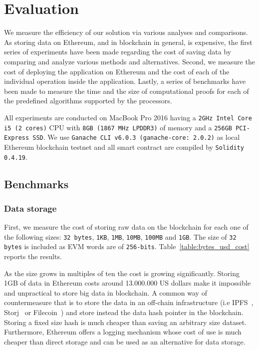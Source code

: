\chapter{Evaluation}
\label{evaluation}

We measure the efficiency of our solution via various analyses and comparisons. As storing data on Ethereum, and in blockchain in general, is expensive, the first series of experiments have been made regarding the cost of saving data by comparing and analyze various methods and alternatives. Second, we measure the cost of deploying the application on Ethereum and the cost of each of the individual operation inside the application. Lastly, a series of benchmarks have been made to measure the time and the size of computational proofs for each of the predefined algorithms supported by the processors.

All experiments are conducted on MacBook Pro 2016 having a \verb|2GHz Intel Core i5 (2 cores)| CPU with \verb|8GB (1867 MHz LPDDR3)| of memory and a \verb|256GB PCI-Express SSD|. We use \verb|Ganache CLI v6.0.3 (ganache-core: 2.0.2)| as local Ethereum blockchain testnet and all smart contract are compiled by \verb|Solidity 0.4.19|.

\section{Benchmarks}
\label{evaluation:benchmarks}

\subsection{Data storage}
\label{evaluation:data_storage}

First, we measure the cost of storing raw data on the blockchain for each one of the following sizes: \verb|32 bytes|, \verb|1KB|, \verb|1MB|, \verb|10MB|, \verb|100MB| and \verb|1GB|. The size of \verb|32 bytes| is included as EVM words are of \verb|256-bits|. Table~\ref{table:bytes_usd_cost} reports the results.

As the size grows in multiples of ten the cost is growing significantly. Storing 1GB of data in Ethereum costs around 13.000.000 US dollars make it impossible and unpractical to store big data in blockchain. A common way of countermeasure that is to store the data in an off-chain infrastructure (i.e IPFS~\cite{ipfs}, Storj~\cite{storj} or Filecoin~\cite{filecoin}) and store instead the data hash pointer in the blockchain. Storing a fixed size hash is much cheaper than saving an arbitrary size dataset. Furthermore, Ethereum offers a logging mechanism whose cost of use is much cheaper than direct storage and can be used as an alternative for data storage.

